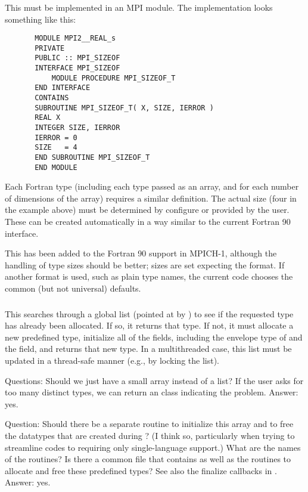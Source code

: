 \documentclass{article}
\begin{document}
\subsubsection{}
This must be implemented in an MPI module.  The implementation looks something
like this:
\begin{verbatim}
       MODULE MPI2__REAL_s
       PRIVATE
       PUBLIC :: MPI_SIZEOF
       INTERFACE MPI_SIZEOF
           MODULE PROCEDURE MPI_SIZEOF_T
       END INTERFACE
       CONTAINS
       SUBROUTINE MPI_SIZEOF_T( X, SIZE, IERROR )
       REAL X
       INTEGER SIZE, IERROR
       IERROR = 0
       SIZE   = 4
       END SUBROUTINE MPI_SIZEOF_T       
       END MODULE
\end{verbatim}
Each Fortran type (including each type passed as an array, and for
each number of dimensions of the array) requires a similar
definition.  The actual size (four in the example above) must be determined by
configure or provided by the user.
These can be created automatically in a way similar to the current
Fortran 90 interface.

This has been added to the Fortran 90 support in MPICH-1, although the
handling of type sizes should be better; sizes are set expecting the
 format.  If another format is used, such as plain type
names, the current code chooses the common (but not universal) defaults.

\subsubsection{}
This searches through a global list (pointed at by
) to see if the requested type has
already been allocated.  If so, it returns that type.  
If not, it must allocate a new predefined type, initialize all of the fields,
including the envelope type of  and the
 field, and returns that new type.
In a multithreaded case, this list must be updated in a thread-safe manner
(e.g., by locking the list).

Questions:
Should we just have a small array instead of a list?  If the user asks for too
many distinct types, we can return an  class
indicating the problem.  Answer: yes.

Question:
Should there be a separate routine to initialize this array and to free the
datatypes that are created during ?  (I think so,
particularly when trying to streamline codes to requiring only single-language
support.)  What are the names of the routines?  Is there a common file that
contains  as well as the routines to
allocate and free these predefined types?  See also the finalize
callbacks in .  Answer: yes.
\end{document}
